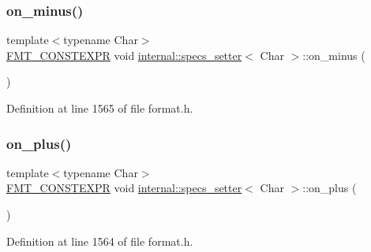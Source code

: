 \mbox{\label{classinternal_1_1specs__setter_a757602c824fafe82d1b85843dd8193c1}} 
\subsubsection{\texorpdfstring{on\+\_\+minus()}{on\_minus()}}
{\footnotesize\ttfamily template$<$typename Char$>$ \\
\hyperlink{core_8h_a69201cb276383873487bf68b4ef8b4cd}{F\+M\+T\+\_\+\+C\+O\+N\+S\+T\+E\+X\+PR} void \hyperlink{classinternal_1_1specs__setter}{internal\+::specs\+\_\+setter}$<$ Char $>$\+::on\+\_\+minus (\begin{DoxyParamCaption}{ }\end{DoxyParamCaption})\hspace{0.3cm}{\ttfamily [inline]}}



Definition at line 1565 of file format.\+h.

\mbox{\label{classinternal_1_1specs__setter_a6e7d9ebef267e0dc2b97d6eb2f16b8c4}} 
\subsubsection{\texorpdfstring{on\+\_\+plus()}{on\_plus()}}
{\footnotesize\ttfamily template$<$typename Char$>$ \\
\hyperlink{core_8h_a69201cb276383873487bf68b4ef8b4cd}{F\+M\+T\+\_\+\+C\+O\+N\+S\+T\+E\+X\+PR} void \hyperlink{classinternal_1_1specs__setter}{internal\+::specs\+\_\+setter}$<$ Char $>$\+::on\+\_\+plus (\begin{DoxyParamCaption}{ }\end{DoxyParamCaption})\hspace{0.3cm}{\ttfamily [inline]}}



Definition at line 1564 of file format.\+h.

\mbox{\label{classinternal_1_1specs__setter_ac97e11a521b65d2f1662ffcf745c60be}} 
